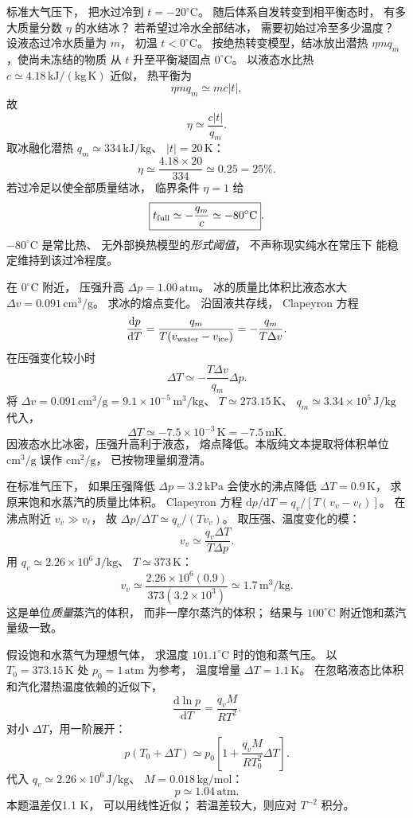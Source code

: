 标准大气压下，
把水过冷到 $t=-20^\circ\mathrm C$。
随后体系自发转变到相平衡态时，
有多大质量分数 $\eta$ 的水结冰？
若希望过冷水全部结冰，
需要初始过冷至多少温度？
\exsolution
设液态过冷水质量为 $m$，
初温 $t<0^\circ\mathrm C$。
按绝热转变模型，结冰放出潜热
$\eta m q_m$，使尚未冻结的物质
从 $t$ 升至平衡凝固点 $0^\circ\mathrm C$。
以液态水比热 $c\simeq4.18\,\mathrm{kJ/(kg\,K)}$
近似，
热平衡为
\[
\eta m q_m\simeq mc|t|,
\]
故
\[
\boxed{\eta\simeq\frac{c|t|}{q_m}}.
\]
取冰融化潜热
$q_m\simeq334\,\mathrm{kJ/kg}$、
$|t|=20\,\mathrm K$：
\[
\boxed{\eta\simeq\frac{4.18\times20}{334}
\simeq0.25=25\%}.
\]
若过冷足以使全部质量结冰，
临界条件 $\eta=1$ 给
\[
\boxed{t_{\rm full}\simeq-\frac{q_m}{c}
\simeq-80^\circ\mathrm C}.
\]
\excheck $-80^\circ\mathrm C$ 是常比热、
无外部换热模型的\emph{形式阈值}，
不声称现实纯水在常压下
能稳定维持到该过冷程度。

在 $0^\circ\mathrm C$ 附近，
压强升高 $\Delta p=1.00\,\mathrm{atm}$。
冰的质量比体积比液态水大
$\Delta v=0.091\,\mathrm{cm^3/g}$。
求冰的熔点变化。
\exsolution
沿固液共存线，
Clapeyron 方程
\[
\frac{\mathrm dp}{\mathrm dT}
=\frac{q_m}{T(v_{\rm water}-v_{\rm ice})}
=-\frac{q_m}{T\Delta v}.
\]
在压强变化较小时
\[
\boxed{\Delta T\simeq
-\frac{T\Delta v}{q_m}\Delta p}.
\]
将 $\Delta v=0.091\,\mathrm{cm^3/g}
=9.1\times10^{-5}\,\mathrm{m^3/kg}$、
$T\simeq273.15\,\mathrm K$、
$q_m\simeq3.34\times10^5\,\mathrm{J/kg}$ 代入，
\[
\boxed{\Delta T\simeq-7.5\times10^{-3}\,\mathrm K
=-7.5\,\mathrm{mK}}.
\]
\excheck 因液态水比冰密，压强升高利于液态，
熔点降低。本版纯文本提取将体积单位
$\mathrm{cm^3/g}$ 误作 $\mathrm{cm^2/g}$，
已按物理量纲澄清。

在标准气压下，
如果压强降低 $\Delta p=3.2\,\mathrm{kPa}$
会使水的沸点降低 $\Delta T=0.9\,\mathrm K$，
求原来饱和水蒸汽的质量比体积。
\exsolution
Clapeyron 方程
$\mathrm dp/\mathrm dT=
q_v/[T(v_v-v_\ell)]$。
在沸点附近
$v_v\gg v_\ell$，
故
$\Delta p/\Delta T
\simeq q_v/(T v_v)$。
取压强、温度变化的模：
\[
\boxed{v_v\simeq\frac{q_v\Delta T}{T\Delta p}}.
\]
用
$q_v\simeq2.26\times10^6\,\mathrm{J/kg}$、
$T\simeq373\,\mathrm K$：
\[
\boxed{v_v\simeq
\frac{2.26\times10^6(0.9)}{373(3.2\times10^3)}
\simeq1.7\,\mathrm{m^3/kg}}.
\]
\excheck 这是单位\emph{质量}蒸汽的体积，
而非一摩尔蒸汽的体积；
结果与 $100^\circ\mathrm C$ 附近饱和蒸汽量级一致。

假设饱和水蒸气为理想气体，
求温度
$101.1^\circ\mathrm C$ 时的饱和蒸气压。
\exsolution
以 $T_0=373.15\,\mathrm K$
处 $p_0=1\,\mathrm{atm}$ 为参考，
温度增量
$\Delta T=1.1\,\mathrm K$。
在忽略液态比体积和汽化潜热温度依赖的近似下，
\[
\frac{\mathrm d\ln p}{\mathrm dT}
=\frac{q_vM}{RT^2}.
\]
对小 $\Delta T$，用一阶展开：
\[
p(T_0+\Delta T)
\simeq p_0\left[
1+\frac{q_vM}{RT_0^2}\Delta T\right].
\]
代入
$q_v\simeq2.26\times10^6\,\mathrm{J/kg}$、
$M=0.018\,\mathrm{kg/mol}$：
\[
\boxed{p\simeq1.04\,\mathrm{atm}}.
\]
\excheck 本题温差仅1.1 K，
可以用线性近似；
若温差较大，则应对 $T^{-2}$ 积分。

